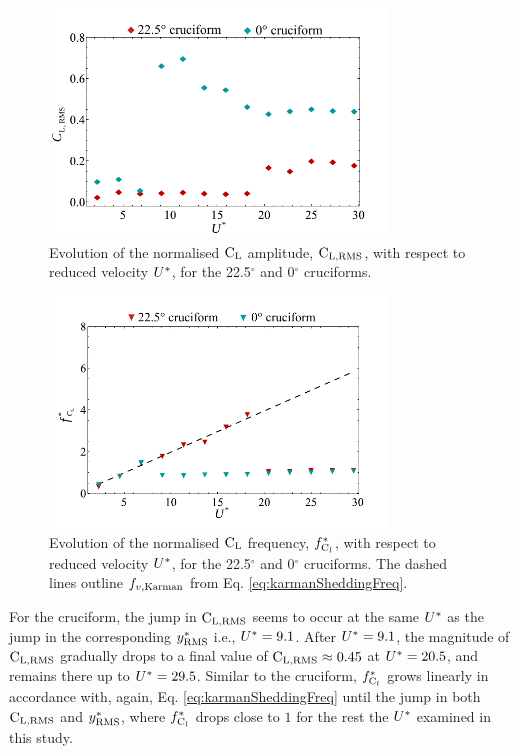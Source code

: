 \documentclass[oneside]{utmthesis}
\begin{document}
\begin{figure}[H]
  \centering
  \includegraphics[width=0.8\textwidth]{figs/clRMS21}
  \caption{Evolution of the normalised $\text{C}_{\text{L}}$ \rms{} amplitude, $\text{C}_{\text{L,RMS}}$, with respect to reduced velocity $U^{*}$, for the 22.5$^{\circ}$ and 0$^{\circ}$ cruciforms.}
  \label{fig:clRMS21}
\end{figure}

\begin{figure}[H]
  \centering
  \includegraphics[width=0.8\textwidth]{figs/clFreq21}
  \caption{Evolution of the normalised $\text{C}_{\text{L}}$ frequency, $f_{\text{C}_{l}}^{*}$, with respect to reduced velocity $U^{*}$, for the 22.5$^{\circ}$ and 0$^{\circ}$ cruciforms. The dashed lines outline $f_{v,\text{Karman}}$ from Eq. \ref{eq:karmanSheddingFreq}.}
  \label{fig:clFreq21}
\end{figure}

For the \angon{} cruciform, the jump in $\text{C}_{\text{L,RMS}}$ seems to occur at the same $U^{*}$ as the jump in the corresponding $y^{*}_{\text{RMS}}$ i.e., $U^{*} = 9.1$. After $U^{*} = 9.1$, the magnitude of $\text{C}_{\text{L,RMS}}$ gradually drops to a final value of $\text{C}_{\text{L,RMS}} \approx 0.45$ at $U^{*} = 20.5$, and remains there up to $U^{*} = 29.5$. Similar to the \angtw{} cruciform, $f_{\text{C}_{l}}^{*}$ grows linearly in accordance with, again, Eq. \ref{eq:karmanSheddingFreq} until the jump in both $\text{C}_{\text{L,RMS}}$ and $y^{*}_{\text{RMS}}$, where $f_{\text{C}_{l}}^{*}$ drops close to $1$ for the rest the $U^{*}$ examined in this study.
\end{document}
